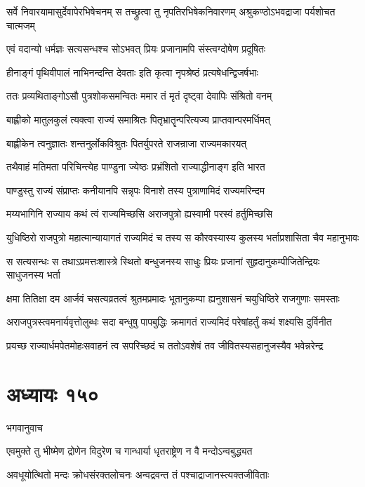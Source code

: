 \threelineshloka
{सर्वे निवारयामासुर्देवापेरभिषेचनम्}
{स तच्छ्रुत्वा तु नृपतिरभिषेकनिवारणम्}
{अश्रुकण्ठोऽभवद्राजा पर्यशोचत चात्मजम्}


\twolineshloka
{एवं वदान्यो धर्मज्ञः सत्यसन्धश्च सोऽभवत्}
{प्रियः प्रजानामपि संस्त्वग्दोषेण प्रदूषितः}


\twolineshloka
{हीनाङ्गं पृथिवीपालं नाभिनन्दन्ति देवताः}
{इति कृत्वा नृपश्रेष्ठं प्रत्यषेधन्द्विजर्षभाः}


\twolineshloka
{ततः प्रव्यथिताङ्गोऽसौ पुत्रशोकसमन्वितः}
{ममार तं मृतं दृष्ट्वा देवापिः संश्रितो वनम्}


\twolineshloka
{बाह्लीको मातुलकुलं त्यक्त्वा राज्यं समाश्रितः}
{पितृभ्रातॄन्परित्यज्य प्राप्तवान्परमर्धिमत्}


\twolineshloka
{बाह्लीकेन त्वनुज्ञातः शन्तनुर्लोकविश्रुतः}
{पितर्युपरते राजन्राजा राज्यमकारयत्}


\twolineshloka
{तथैवाहं मतिमता परिचिन्त्येह पाण्डुना}
{ज्येष्ठः प्रभ्रंशितो राज्याद्धीनाङ्ग इति भारत}


\twolineshloka
{पाण्डुस्तु राज्यं संप्राप्तः कनीयानपि सन्नृपः}
{विनाशे तस्य पुत्राणामिदं राज्यमरिन्दम}


\twolineshloka
{मय्यभागिनि राज्याय कथं त्वं राज्यमिच्छसि}
{अराजपुत्रो ह्यस्वामी परस्वं हर्तुमिच्छसि}


\twolineshloka
{युधिष्ठिरो राजपुत्रो महात्मान्यायागतं राज्यमिदं च तस्य}
{स कौरवस्यास्य कुलस्य भर्ताप्रशासिता चैव महानुभावः}


\twolineshloka
{स सत्यसन्धः स तथाऽप्रमत्तःशास्त्रे स्थितो बन्धुजनस्य साधुः}
{प्रियः प्रजानां सुहृदानुकम्पीजितेन्द्रियः साधुजनस्य भर्ता}


\twolineshloka
{क्षमा तितिक्षा दम आर्जवं चसत्यव्रतत्वं श्रुतमप्रमादः}
{भूतानुकम्पा ह्यनुशासनं चयुधिष्ठिरे राजगुणाः समस्ताः}


\twolineshloka
{अराजपुत्रस्त्वमनार्यवृत्तोलुब्धः सदा बन्धुषु पापबुद्धिः}
{क्रमागतं राज्यमिदं परेषांहर्तुं कथं शक्ष्यसि दुर्विनीत}


\twolineshloka
{प्रयच्छ राज्यार्धमपेतमोहःसवाहनं त्व सपरिच्छदं च}
{ततोऽवशेषं तव जीवितस्यसहानुजस्यैव भवेन्नरेन्द्र}


\chapter{अध्यायः १५०}
\twolineshloka
{भगवानुवाच}
{}


\twolineshloka
{एवमुक्ते तु भीष्मेण द्रोणेन विदुरेण च}
{गान्धार्या धृतराष्ट्रेण न वै मन्दोऽन्वबुद्ध्यत}


\twolineshloka
{अवधूयोत्थितो मन्दः क्रोधसंरक्तलोचनः}
{अन्वद्रवन्त तं पश्चाद्राजानस्त्यक्तजीविताः}


